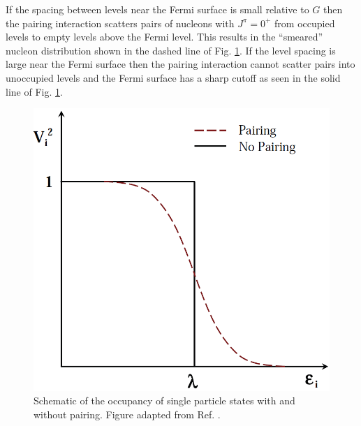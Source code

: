 If the spacing between levels near the Fermi surface is small relative to $G$ then the pairing interaction scatters pairs of nucleons with $J^{\pi}=0^+$ from occupied levels to empty levels above the Fermi level. This results in the ``smeared'' nucleon distribution shown in the dashed line of Fig. \ref{fig:chp2-pairing-fermi-surface}. If the level spacing is large near the Fermi surface then the pairing interaction cannot scatter pairs into unoccupied levels and the Fermi surface has a sharp cutoff as seen in the solid line of Fig. \ref{fig:chp2-pairing-fermi-surface}.
\begin{figure}[t!]
\centerline{\includegraphics[height=0.3\textheight]{./img/c2/pairinginteraction.png}}
	\caption{Schematic of the occupancy of single particle states with and without pairing. Figure adapted from Ref. \cite{xfwangDissertation}.\label{fig:chp2-pairing-fermi-surface}}
\end{figure}

